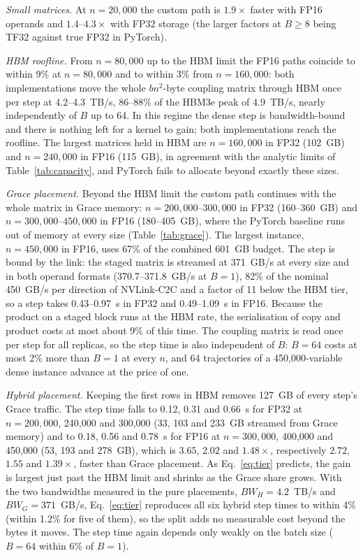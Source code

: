 \documentclass[11pt,a4paper]{article}
\begin{document}
\emph{Small matrices.} At $n=20{,}000$ the custom path is $1.9\times$ faster with FP16 operands and $1.4$--$4.3\times$ with FP32 storage (the larger factors at $B\ge8$ being TF32 against true FP32 in PyTorch).

\emph{HBM roofline.} From $n=80{,}000$ up to the HBM limit the FP16 paths coincide to within 9\% at $n=80{,}000$ and to within 3\% from $n=160{,}000$: both implementations move the whole $bn^2$-byte coupling matrix through HBM once per step at 4.2--4.3~TB/s, 86--88\% of the HBM3e peak of 4.9~TB/s, nearly independently of $B$ up to 64. In this regime the dense step is bandwidth-bound and there is nothing left for a kernel to gain; both implementations reach the roofline. The largest matrices held in HBM are $n=160{,}000$ in FP32 (102~GB) and $n=240{,}000$ in FP16 (115~GB), in agreement with the analytic limits of Table~\ref{tab:capacity}, and PyTorch fails to allocate beyond exactly these sizes.

\emph{Grace placement.} Beyond the HBM limit the custom path continues with the whole matrix in Grace memory: $n=200{,}000$--$300{,}000$ in FP32 (160--360~GB) and $n=300{,}000$--$450{,}000$ in FP16 (180--405~GB), where the PyTorch baseline runs out of memory at every size (Table~\ref{tab:grace}). The largest instance, $n=450{,}000$ in FP16, uses 67\% of the combined 601~GB budget. The step is bound by the link: the staged matrix is streamed at 371~GB/s at every size and in both operand formats (370.7--371.8~GB/s at $B=1$), 82\% of the nominal 450~GB/s per direction of NVLink-C2C and a factor of 11 below the HBM tier, so a step takes 0.43--0.97~s in FP32 and 0.49--1.09~s in FP16. Because the product on a staged block runs at the HBM rate, the serialisation of copy and product costs at most about 9\% of this time. The coupling matrix is read once per step for all replicas, so the step time is also independent of $B$: $B=64$ costs at most 2\% more than $B=1$ at every $n$, and 64 trajectories of a 450,000-variable dense instance advance at the price of one.

\emph{Hybrid placement.} Keeping the first rows in HBM removes 127~GB of every step's Grace traffic. The step time falls to 0.12, 0.31 and 0.66~s for FP32 at $n=200{,}000$, 240,000 and 300,000 (33, 103 and 233~GB streamed from Grace memory) and to 0.18, 0.56 and 0.78~s for FP16 at $n=300{,}000$, 400,000 and 450,000 (53, 193 and 278~GB), which is $3.65$, $2.02$ and $1.48\times$, respectively $2.72$, $1.55$ and $1.39\times$, faster than Grace placement. As Eq.~\eqref{eq:tier} predicts, the gain is largest just past the HBM limit and shrinks as the Grace share grows. With the two bandwidths measured in the pure placements, $BW_H=4.2$~TB/s and $BW_G=371$~GB/s, Eq.~\eqref{eq:tier} reproduces all six hybrid step times to within 4\% (within 1.2\% for five of them), so the split adds no measurable cost beyond the bytes it moves. The step time again depends only weakly on the batch size ($B=64$ within 6\% of $B=1$).
\end{document}
